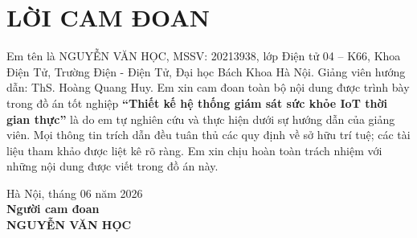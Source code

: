 \section*{LỜI CAM ĐOAN}
\thispagestyle{empty}
Em tên là NGUYỄN VĂN HỌC, MSSV: 20213938, lớp Điện tử 04 -- K66, Khoa Điện Tử, Trường Điện - Điện Tử, Đại học Bách Khoa Hà Nội. Giảng viên hướng dẫn: ThS. Hoàng Quang Huy. Em xin cam đoan toàn bộ nội dung được trình bày trong đồ án tốt nghiệp \textbf{``Thiết kế hệ thống giám sát sức khỏe IoT thời gian thực''} là do em tự nghiên cứu và thực hiện dưới sự hướng dẫn của giảng viên. Mọi thông tin trích dẫn đều tuân thủ các quy định về sở hữu trí tuệ; các tài liệu tham khảo được liệt kê rõ ràng. Em xin chịu hoàn toàn trách nhiệm với những nội dung được viết trong đồ án này.

\vspace{0.6cm}
\hfill
\begin{minipage}{0.5\textwidth}
    \centering
    Hà Nội, tháng 06 năm 2026 \\
    \vspace{0.2cm}
    \textbf{Người cam đoan} \\
    \vspace{1.3cm}
    \textbf{NGUYỄN VĂN HỌC}
\end{minipage}
\cleardoublepage
